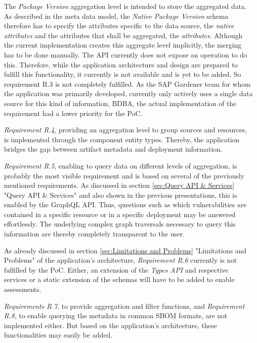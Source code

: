 The \emph{Package Version} aggregation level is intended to store the aggregated data. As described in the meta data model, the \emph{Native Package Version} schema therefore has to specify the attributes specific to the data source, the \emph{native attributes} and the attributes that shall be aggregated, the \emph{attributes}. Although the current implementation creates this aggregate level implicitly, the merging has to be done manually. The API currently does not expose an operation to do this. Therefore, while the application architecture and design are prepared to fulfill this functionality, it currently is not available and is yet to be added. So requirement R.3 is not completely fulfilled. As the SAP Gardener team for whom the application was primarily developed, currently only actively uses a single data source for this kind of information, BDBA, the actual implementation of the requirement had a lower priority for the PoC.\par
\emph{Requirement R.4}, providing an aggregation level to group sources and resources, is implemented through the component entity types. Thereby, the application bridges the gap between artifact metadata and deployment information.\par
\emph{Requirement R.5}, enabling to query data on different levels of aggregation, is probably the most visible requirement and is based on several of the previously mentioned requirements. As discussed in section \ref{sec:Query API & Services} "Query API \& Services" and also shown in the previous presentations, this is enabled by the GraphQL API. Thus, questions such as which vulnerabilities are contained in a specific resource or in a specific deployment may be answered effortlessly. The underlying complex graph traversals necessary to query this information are thereby completely transparent to the user.\par
As already discussed in section \ref{sec:Limitations and Problems} "Limitations and Problems" of the application's architecture, \emph{Requirement R.6} currently is not fulfilled by the PoC. Either, an extension of the \emph{Types API} and respective services or a static extension of the schemas will have to be added to enable assessments.\par
\emph{Requirements R.7}, to provide aggregation and filter functions, and \emph{Requirement R.8}, to enable querying the metadata in common SBOM formats, are not implemented either. But based on the application's architecture, these functionalities may easily be added.\\

